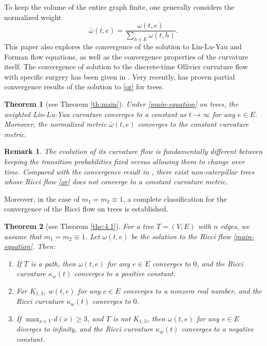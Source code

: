 \documentclass{article}
\newtheorem{theorem}{Theorem}[section]
\newtheorem{remark}{Remark}
\begin{document}
To keep the volume of the entire graph finite, one generally considers 
the normalized  weight
\[\bar{\omega}(t,e)=\frac{\omega(t,e)}{\sum_{h\in E}\omega(t,h)}.\]
This paper also explores the convergence of the solution to Lin-Lu-Yau and Forman flow equations, as well as the convergence properties of the curvature itself. The convergence of solution to the discrete-time Ollivier curvature flow  with specific surgery has been  given in \cite{RF24}. Very recently, \cite{BHLL25} has proven partial convergence results of the solution  to \eqref{or} for trees.

 

\begin{theorem}[see Theorem \ref{th:main}]
Under \eqref{main-equation} on trees, the weighted Lin-Lu-Yau curvature  converges to a constant as $t\rightarrow\infty$ for any $e\in E$. Moreover, the normalized metric $\bar{\omega}(t,e)$ converges to the constant curvature metric.
\end{theorem}
\begin{remark}
    The evolution of its curvature flow is fundamentally different between keeping the transition probabilities fixed versus allowing them to change over time. Compared with the convergence result in \cite{BHLL25},  there exist non-caterpillar trees whose Ricci flow \eqref{or}  does not converge to a constant curvature metric.
\end{remark}

Moreover, in the case of $m_1=m_2\equiv1$, a complete classification for the convergence of the Ricci flow on trees is established.
\begin{theorem}[see Theorem \ref{the:4.1}]
\label{coro1}
 For a tree $T=(V,E)$ with $n$ edges,  we assume that $m_1=m_2\equiv1$. Let $\omega(t,e)$ be the solution to the Ricci flow \eqref{main-equation}. Then:
 \begin{enumerate}
    \item If  $T$ is a path, then $\omega(t,e)$ for any $e\in E$  converges to $0$, and the Ricci curvature $\kappa_w(t)$ converges to a positive constant.   
    \item For $K_{1,3}$,  $w(t,e)$ for any $e\in E$  converges to a nonzero real number, and the Ricci curvature $\kappa_w(t)$ converges to $0$.
    \item If $\max_{x\in V}d(x)\geq 3$, and $T$ is not $K_{1,3}$,  then $\omega(t,e)$ for any $e\in E$ diverges to infinity, and the Ricci curvature $\kappa_w(t)$ converges to a negative constant.
 \end{enumerate}
\end{theorem}
\end{document}
